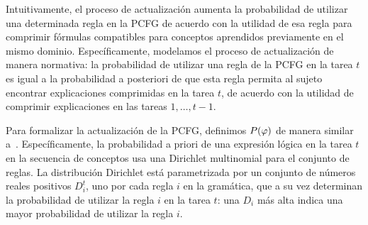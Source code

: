 
Intuitivamente, el proceso de actualización aumenta la probabilidad de utilizar una determinada regla en la PCFG de acuerdo con la utilidad de esa regla para comprimir fórmulas compatibles para conceptos aprendidos previamente en el mismo dominio. Específicamente, modelamos el proceso de actualización de manera normativa: la probabilidad de utilizar una regla de la PCFG en la tarea $t$ es igual a la probabilidad a posteriori de que esta regla permita al sujeto encontrar explicaciones comprimidas en la tarea $t$, de acuerdo con la utilidad de comprimir explicaciones en las tareas $1,\dots,t-1$.


Para formalizar la actualización de la PCFG, definimos $P(\varphi)$ de manera similar a~\cite{goodman2008rational}. Específicamente, la probabilidad a priori de una expresión lógica en la tarea $t$ en la secuencia de conceptos usa una Dirichlet  multinomial para el conjunto de reglas. La distribución Dirichlet  está parametrizada por un conjunto de números reales positivos $D_{i}^{t}$, uno por cada regla $i$ en la gramática, que a su vez determinan la probabilidad de utilizar la regla $i$ en la tarea $t$: una $D_{i}$ más alta indica una mayor probabilidad de utilizar la regla $i$.


